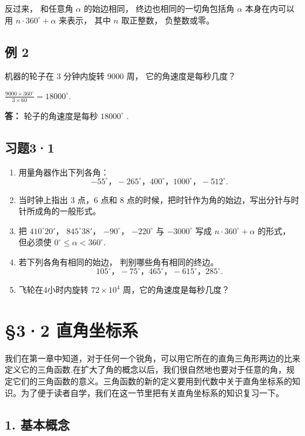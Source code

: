 反过来， 和任意角 \(\alpha\) 的始边相同， 终边也相同的一切角包括角
\(\alpha\) 本身在内可以用 \(n \cdot 360^{\circ} + \alpha\) 来表示， 其中
\(n\) 取正整数， 负整数或零。

\subsection{例 2}

机器的轮子在 3 分钟内旋转 9000 周， 它的角速度是每秒几度？

\(\frac{9000\times 360^{\circ}}{3\times 60} = 18000^{\circ}.\)

\textbf{答：} 轮子的角速度是每秒 \(18000^{\circ}\) .

\subsection{习题3·1}

\begin{enumerate}
\item
  用量角器作出下列各角：
\[
- 55 ^{\circ}\text{，} - 265 ^{\circ}\text{，} 400 ^{\circ}\text{，} 1000 ^{\circ}\text{，} - 512 ^{\circ}.
\]
\item
  当时钟上指出 3 点，6 点和 8
  点的时候，把时针作为角的始边，写出分针与时针所成角的一般形式。
\item
  把 \(410^{\circ}20'\)， \(845^{\circ}38'\)， \(-90^{\circ}\)，
  \(-220^{\circ}\) 与 \(-3000^{\circ}\) 写成
  \(n \cdot 360^{\circ} + \alpha\) 的形式， 但必须使
  \(0^{\circ} \leqslant \alpha < 360^{\circ}\).
\item
  若下列各角有相同的始边， 判别哪些角有相同的终边。
\[
105 ^{\circ}\text{，} - 75 ^{\circ}\text{，} 465 ^{\circ}\text{，} - 615 ^{\circ}\text{，} 285 ^{\circ}.
\]
\item
  飞轮在4小时内旋转 \(72 \times 10^{4}\) 周，它的角速度是每秒几度？
\end{enumerate}

\section{§3·2 直角坐标系}

我们在第一章中知道，对于任何一个锐角，可以用它所在的直角三角形两边的比来定义它的三角函数.在扩大了角的概念以后，我们很自然地也要对于任意的角，规定它们的三角函数的意义。三角函数的新的定义要用到代数中关于直角坐标系的知识。为了便于读者自学，我们在这一节里把有关直角坐标系的知识复习一下。

\subsection{1. 基本概念}

